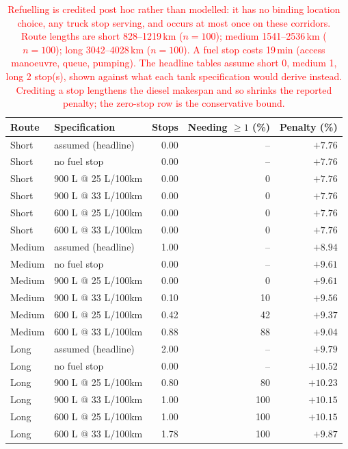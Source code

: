 \documentclass[preprint,12pt,3p]{elsarticle}
\newcommand{\red}[1]{\textcolor{red}{#1}}
\begin{document}
\begin{table}[ht]\centering
\caption{\red{Refuelling is credited post hoc rather than modelled: it has no binding location choice, any truck stop serving, and occurs at most once on these corridors.  Route lengths are short 828--1219\,km ($n=100$); medium 1541--2536\,km ($n=100$); long 3042--4028\,km ($n=100$).  A fuel stop costs 19\,min (access manoeuvre, queue, pumping).  The headline tables assume short 0, medium 1, long 2 stop(s), shown against what each tank specification would derive instead.  Crediting a stop lengthens the diesel makespan and so shrinks the reported penalty; the zero-stop row is the conservative bound.}}
\label{tab:diesel-refuel}
\begin{tabular}{llrrr}
\hline
Route & Specification & Stops & Needing $\geq 1$ (\%) & Penalty (\%) \\
\hline
Short & assumed (headline) & 0.00 & -- & $+7.76$ \\
Short & no fuel stop & 0.00 & -- & $+7.76$ \\
Short & 900 L @ 25 L/100km & 0.00 & 0 & $+7.76$ \\
Short & 900 L @ 33 L/100km & 0.00 & 0 & $+7.76$ \\
Short & 600 L @ 25 L/100km & 0.00 & 0 & $+7.76$ \\
Short & 600 L @ 33 L/100km & 0.00 & 0 & $+7.76$ \\
Medium & assumed (headline) & 1.00 & -- & $+8.94$ \\
Medium & no fuel stop & 0.00 & -- & $+9.61$ \\
Medium & 900 L @ 25 L/100km & 0.00 & 0 & $+9.61$ \\
Medium & 900 L @ 33 L/100km & 0.10 & 10 & $+9.56$ \\
Medium & 600 L @ 25 L/100km & 0.42 & 42 & $+9.37$ \\
Medium & 600 L @ 33 L/100km & 0.88 & 88 & $+9.04$ \\
Long & assumed (headline) & 2.00 & -- & $+9.79$ \\
Long & no fuel stop & 0.00 & -- & $+10.52$ \\
Long & 900 L @ 25 L/100km & 0.80 & 80 & $+10.23$ \\
Long & 900 L @ 33 L/100km & 1.00 & 100 & $+10.15$ \\
Long & 600 L @ 25 L/100km & 1.00 & 100 & $+10.15$ \\
Long & 600 L @ 33 L/100km & 1.78 & 100 & $+9.87$ \\
\hline
\end{tabular}
\end{table}
\end{document}
